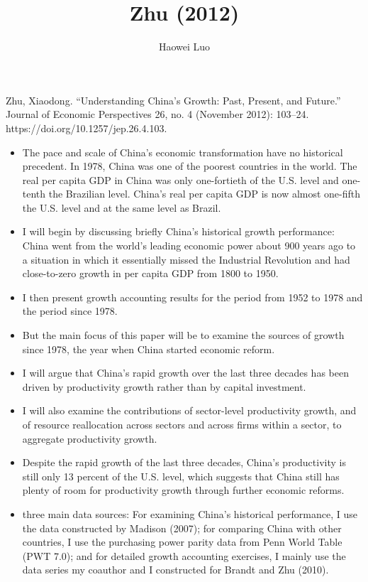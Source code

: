 \documentclass{article}
\title{Zhu (2012)}
\author{Haowei Luo}
\begin{document}
    \maketitle
    Zhu, Xiaodong. “Understanding China’s Growth: Past, Present, and Future.” Journal of Economic Perspectives 26, no. 4 (November 2012): 103–24. https://doi.org/10.1257/jep.26.4.103.
    
    \begin{itemize}
        \item The pace and scale of China’s economic transformation have no historical precedent. In 1978, China was one of the poorest countries in the world. The real per capita GDP in China was only one-fortieth of the U.S. level and one-tenth the Brazilian level. China’s real per capita GDP is now almost one-fifth the U.S. level and at the same level as Brazil.
        \item I will begin by discussing briefly China’s historical growth performance: China went from the world’s leading economic power about 900 years ago to a situation in which it essentially missed the Industrial Revolution and had close-to-zero growth in per capita GDP from 1800 to 1950.
        \item I then present growth accounting results for the period from 1952 to 1978 and the period since 1978.
        \item But the main focus of this paper will be to examine the sources of growth since 1978, the year when China started economic reform. 
        \item I will argue that China’s rapid growth over the last three decades has been driven by productivity growth rather than by capital investment. 
        \item  I will also examine the contributions of sector-level productivity growth, and of resource reallocation across sectors and across firms within a sector, to aggregate productivity growth.
        \item Despite the rapid growth of the last three decades, China’s productivity is still only 13 percent of the U.S. level, which suggests that China still has plenty of room for productivity growth through further economic reforms.
        \item three main data sources: For examining China’s historical performance, I use the data constructed by Madison (2007); for comparing China with other countries, I use the purchasing power parity data from Penn World Table (PWT 7.0); and for detailed growth accounting exercises, I mainly use the data series my coauthor and I constructed for Brandt and Zhu (2010).
        
    \end{itemize}
\end{document}
